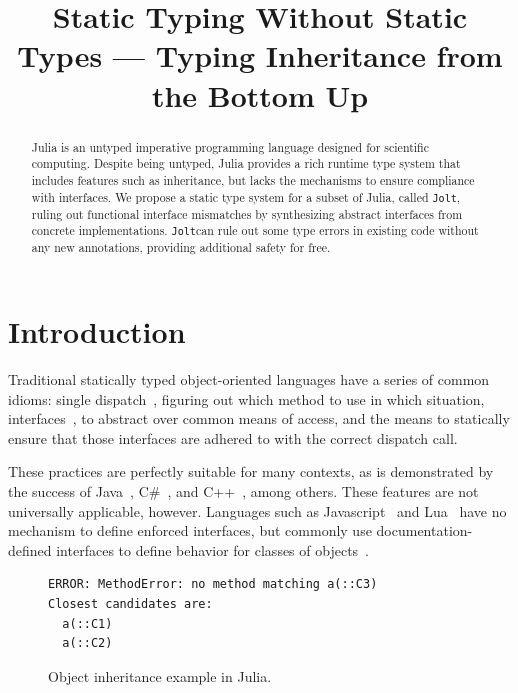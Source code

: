 \documentclass[preprint]{sigplanconf}
\newcommand{\xt}[1]{\texttt{#1}}
\newcommand{\jolt}{\xt{Jolt}}
\begin{document}
\title{Static Typing Without Static Types --- Typing Inheritance from the Bottom Up} 
\maketitle

\begin{abstract}
Julia is an untyped imperative programming language designed for scientific computing. 
Despite being untyped, Julia provides a rich runtime type system that includes features such as  
inheritance, but lacks the mechanisms to ensure compliance with interfaces.
We propose a static type system for a subset of Julia, called \jolt, ruling out functional interface mismatches
by synthesizing abstract interfaces from concrete implementations. \jolt\space can rule
out some type errors in existing code without any new annotations, providing additional safety for free.
\end{abstract}


\section{Introduction}

Traditional statically typed object-oriented languages have a series of
common idioms: single dispatch~\cite{jls}, figuring out which method
to use in which situation, interfaces~\cite{objinter, fj}, to abstract over 
common means of access, and the means to statically
ensure that those interfaces are adhered to with the correct dispatch call.

These practices are perfectly suitable for many contexts,
as is demonstrated by the success of Java~\cite{jls}, C\#~\cite{csls}, and C++~\cite{cppls}, among others.
These features are not universally applicable, however. Languages such as 
Javascript~\cite{ecma} and Lua~\cite{lualang} have no mechanism to define enforced
interfaces, but commonly use documentation-defined interfaces to define behavior
for classes of objects~\cite{lualang}.

\begin{figure}[h]


\begin{Verbatim}[fontsize=\scriptsize]
ERROR: MethodError: no method matching a(::C3)
Closest candidates are:
  a(::C1)
  a(::C2)
\end{Verbatim}
\caption{Object inheritance example in Julia.}
\label{code:broken}
\end{figure}
\end{document}
